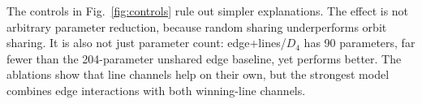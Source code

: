 The controls in Fig.~\ref{fig:controls} rule out simpler
explanations. The effect is not arbitrary parameter reduction,
because random sharing underperforms orbit sharing. It is also
not just parameter count: edge+lines/$D_4$ has 90 parameters,
far fewer than the 204-parameter unshared edge baseline, yet
performs better. The ablations show that line channels help on
their own, but the strongest model combines edge interactions
with both winning-line channels.
